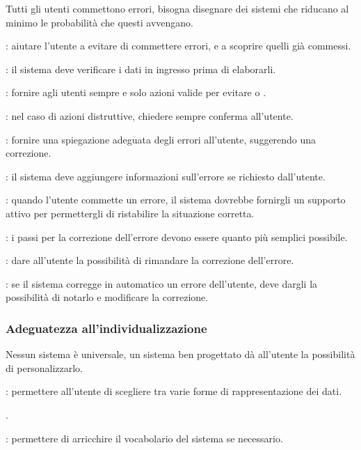 Tutti gli utenti commettono errori, bisogna disegnare dei sistemi che riducano al minimo le probabilità che questi avvengano.

: aiutare l'utente a evitare di commettere errori, e a scoprire quelli già commessi.

: il sistema deve verificare i dati in ingresso prima di elaborarli.

: fornire agli utenti sempre e solo azioni valide per evitare  o .

: nel caso di azioni distruttive, chiedere sempre conferma all'utente.

: fornire una spiegazione adeguata degli errori all'utente, suggerendo una correzione.

: il sistema deve aggiungere informazioni sull'errore se richiesto dall'utente.

: quando l’utente commette un errore, il sistema dovrebbe fornirgli un supporto attivo per permettergli di ristabilire la situazione corretta.

: i passi per la correzione dell'errore devono essere quanto più semplici possibile.

: dare all'utente la possibilità di rimandare la correzione dell'errore.

: se il sistema corregge in automatico un errore dell'utente, deve dargli la possibilità di notarlo e modificare la correzione.

\subsubsection{Adeguatezza all’individualizzazione}

Nessun sistema è universale, un sistema ben progettato dà all'utente la possibilità di personalizzarlo.

: permettere all'utente di scegliere tra varie forme di rappresentazione dei dati.

.

: permettere di arricchire il vocabolario del sistema se necessario.

